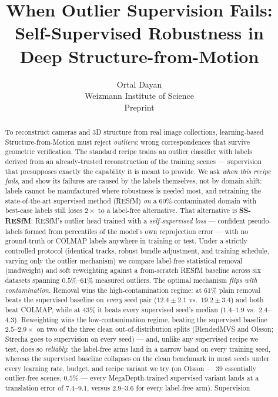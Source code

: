 \documentclass{article}
\title{When Outlier Supervision Fails:\\
Self-Supervised Robustness in Deep Structure-from-Motion}
\author{Ortal Dayan\\Weizmann Institute of Science\\[2pt]\normalsize Preprint}
\newcommand{\mad}{madweight}
\begin{document}
\maketitle

\begin{abstract}
To reconstruct cameras and 3D structure from real image collections, learning-based
Structure-from-Motion must reject \emph{outliers}: wrong correspondences that survive
geometric verification. The standard recipe trains an outlier classifier with labels
derived from an already-trusted reconstruction of the training scenes --- supervision
that presupposes exactly the capability it is meant to provide. We ask \emph{when this
recipe fails}, and show its failures are caused by the labels themselves, not by domain
shift: labels cannot be manufactured where robustness is needed most, and retraining the
state-of-the-art supervised method (RESfM) \emph{on} a $60\%$-contaminated domain with
best-case labels still loses $2\times$ to a label-free alternative. That alternative is
\textbf{SS-RESfM}: RESfM's outlier head trained with a \emph{self-supervised loss} ---
confident pseudo-labels formed from percentiles of the model's own reprojection error ---
with no ground-truth or COLMAP labels anywhere in training or test. Under a strictly controlled protocol (identical tracks, robust bundle adjustment,
and training schedule, varying only the outlier mechanism) we compare label-free
statistical removal (\mad{}) and soft reweighting against a from-scratch RESfM baseline
across six datasets spanning $0.5\%$--$61\%$ measured outliers. The optimal mechanism
\emph{flips with contamination}. Removal wins the high-contamination regime: at $61\%$
plain removal beats the supervised baseline on \emph{every} seed pair
($12.4\pm2.1$ vs.\ $19.2\pm3.4$) and both beat COLMAP, while at $43\%$ it beats every
supervised seed's median ($1.4$--$1.9$ vs.\ $2.4$--$4.3$). Reweighting wins the low-contamination regime, beating
the supervised baseline $2.5$--$2.9\times$ on two of the three clean out-of-distribution
splits (BlendedMVS and Olsson; Strecha goes to supervision on every seed) --- and,
unlike any supervised recipe we test, does so \emph{reliably}: the label-free arms land
in a narrow band on every training seed, whereas the supervised baseline collapses on
the clean benchmark in most seeds under every learning rate, budget, and recipe variant
we try (on Olsson --- $39$ essentially outlier-free scenes, $0.5\%$ --- every
MegaDepth-trained supervised variant lands at a translation error of $7.4$--$9.1$,
versus $2.9$--$3.6$ for every label-free arm). Supervision

\end{abstract}
\end{document}
